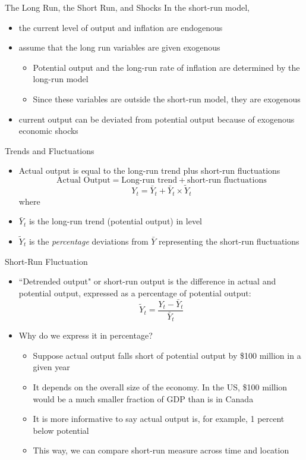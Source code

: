 \documentclass[aspectratio=1610]{beamer}
\begin{document}
\begin{frame}[wide]{The Long Run, the Short Run, and Shocks}
	In the short-run model, 
	\begin{itemize}
		\item the current level of output and inflation are endogenous
		\item assume that the long run variables are given exogenous
		\begin{itemize}
			\item Potential output and the long-run rate of inflation are determined by the long-run model
			\item Since these variables are outside the short-run model, they are exogenous
		\end{itemize}
		\item current output can be deviated from potential output because of exogenous economic shocks
	\end{itemize}
\end{frame}

\begin{frame}[wide]{Trends and Fluctuations}
	\begin{itemize}
		\item Actual output is equal to the long-run trend plus short-run fluctuations
		\[\text{Actual Output} = \text{Long-run trend} + \text{short-run fluctuations}\]
		\[Y_t = \bar{Y}_t + \bar{Y}_t\times \tilde{Y}_t\]
		where
		\item[] \quad $\bar{Y}_t$ is the long-run trend (potential output) in level
		\item[] \quad $\tilde{Y}_t$ is the \textit{percentage} deviations from $\bar{Y}$ representing the short-run fluctuations
	\end{itemize}
\end{frame}

\begin{frame}[wide]{Short-Run Fluctuation}
	\begin{itemize}
		\item ``Detrended output" or short-run output is the difference in actual and potential output, expressed as a percentage of potential output:
		\[\tilde{Y}_t = \frac{Y_t -\bar{Y}_t}{\bar{Y}_t}\]
		\item Why do we express it in percentage?
		\begin{itemize}
			\item Suppose actual output falls short of potential output by \$100 million in a given year
			\item It depends on the overall size of the economy. In the US, \$100 million would be a much smaller fraction of GDP than is in Canada
			\item It is more informative to say actual output is, for example, 1 percent below potential
			\item This way, we can compare short-run measure across time and location
		\end{itemize}
	\end{itemize}
\end{frame}
\end{document}

